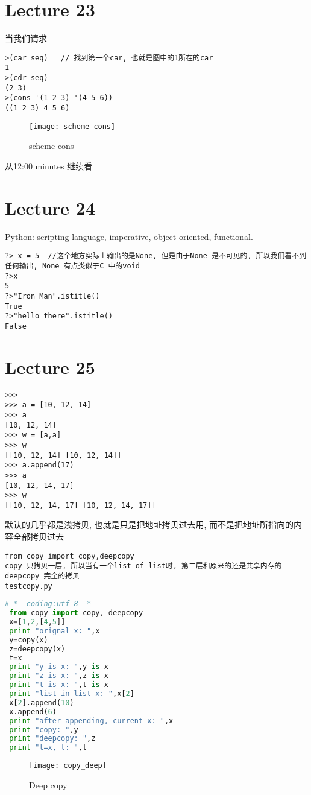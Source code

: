 \documentclass{article}
\begin{document}
\section{Lecture 23}
当我们请求
\begin{verbatim}
>(car seq)   // 找到第一个car, 也就是图中的1所在的car
1
>(cdr seq)
(2 3)
>(cons '(1 2 3) '(4 5 6))
((1 2 3) 4 5 6)
\end{verbatim}
\begin{figure}[htbp]
	\centering
	\texttt{[image: scheme-cons]}\\
	\caption{scheme cons}\label{fig.scheme.cons}
\end{figure}

从12:00 minutes 继续看

\section{Lecture 24}
Python:
scripting language,
imperative,
object-oriented,
functional.

\begin{verbatim}
?> x = 5  //这个地方实际上输出的是None, 但是由于None 是不可见的, 所以我们看不到任何输出, None 有点类似于C 中的void
?>x
5
?>"Iron Man".istitle()
True
?>"hello there".istitle()
False
\end{verbatim}

\section{Lecture 25}
\begin{verbatim}
>>>
>>> a = [10, 12, 14]
>>> a
[10, 12, 14]
>>> w = [a,a]
>>> w
[[10, 12, 14] [10, 12, 14]]
>>> a.append(17)
>>> a
[10, 12, 14, 17]
>>> w
[[10, 12, 14, 17] [10, 12, 14, 17]]
\end{verbatim}
默认的几乎都是浅拷贝, 也就是只是把地址拷贝过去用, 而不是把地址所指向的内容全部拷贝过去

\begin{verbatim}
from copy import copy,deepcopy
copy 只拷贝一层, 所以当有一个list of list时, 第二层和原来的还是共享内存的
deepcopy 完全的拷贝
testcopy.py
\end{verbatim}

\begin{lstlisting}[language = Python]
#-*- coding:utf-8 -*-
 from copy import copy, deepcopy
 x=[1,2,[4,5]]
 print "orignal x: ",x
 y=copy(x)
 z=deepcopy(x)
 t=x
 print "y is x: ",y is x
 print "z is x: ",z is x
 print "t is x: ",t is x
 print "list in list x: ",x[2]
 x[2].append(10)
 x.append(6)
 print "after appending, current x: ",x
 print "copy: ",y
 print "deepcopy: ",z
 print "t=x, t: ",t
 \end{lstlisting}
\begin{figure}[htbp]
	\centering
	\texttt{[image: copy\_deep]}\\
	\caption{Deep copy}\label{fig.copy.deep}
\end{figure}
\end{document}
